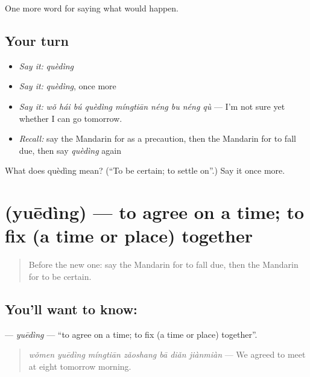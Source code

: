 \begin{grammarlens}[title={What you've built}]
One more word for saying what would happen.
\end{grammarlens}

\subsection*{Your turn}
\begin{itemize}
\raggedright
  \item \emph{Say it:} \emph{quèdìng}
  \item \emph{Say it:} \emph{quèdìng}, once more
  \item \emph{Say it:} \emph{wǒ hái bú quèdìng míngtiān néng bu néng qù} — I'm not sure yet whether I can go tomorrow.
  \item \emph{Recall:} say the Mandarin for as a precaution, then the Mandarin for to fall due, then say \emph{quèdìng} again
\end{itemize}

\begin{tcolorbox}[breakable,colback=teal!4,colframe=teal!35!black,title={Before you move on}]
What does quèdìng mean? (\textquotedblleft{}To be certain; to settle on\textquotedblright{}.) Say it once more.
\end{tcolorbox}
\section[\texorpdfstring{\zh{约定} (yuēdìng)}{约定 (yuēdìng)}]{ (yuēdìng) — to agree on a time; to fix (a time or place) together}

\label{lesson:ZH-C390-yueding}



\begin{quote}
Before the new one: say the Mandarin for to fall due, then the Mandarin for to be certain.
\end{quote}

\subsection*{You'll want to know: }
\textbf{} — \emph{yuēdìng} — \textquotedblleft{}to agree on a time; to fix (a time or place) together\textquotedblright{}.

\begin{quote}
\textbf{} \emph{wǒmen yuēdìng míngtiān zǎoshang bā diǎn jiànmiàn} — We agreed to meet at eight tomorrow morning.
\end{quote}

